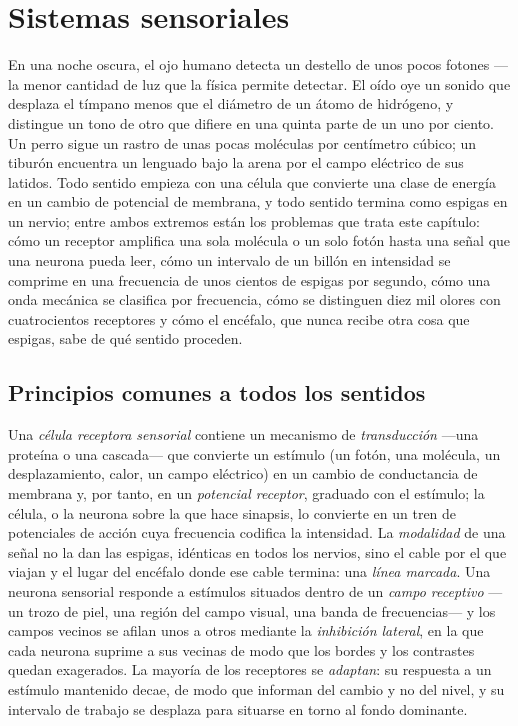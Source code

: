 \chapter{Sistemas sensoriales}\label{ch:b3:sensory-systems}

En una noche oscura, el ojo humano detecta un destello de unos pocos
fotones ---la menor cantidad de luz que la física permite detectar. El
oído oye un sonido que desplaza el tímpano menos que el diámetro de un
átomo de hidrógeno, y distingue un tono de otro que difiere en una
quinta parte de un uno por ciento. Un perro sigue un rastro de unas
pocas moléculas por centímetro cúbico; un tiburón encuentra un lenguado
bajo la arena por el campo eléctrico de sus latidos. Todo sentido
empieza con una célula que convierte una clase de energía en un cambio
de potencial de membrana, y todo sentido termina como espigas en un
nervio; entre ambos extremos están los problemas que trata este
capítulo: cómo un receptor amplifica una sola molécula o un solo fotón
hasta una señal que una neurona pueda leer, cómo un intervalo de un
billón en intensidad se comprime en una frecuencia de unos cientos de
espigas por segundo, cómo una onda mecánica se clasifica por
frecuencia, cómo se distinguen diez mil olores con cuatrocientos
receptores y cómo el encéfalo, que nunca recibe otra cosa que espigas,
sabe de qué sentido proceden.

\section{Principios comunes a todos los sentidos}

\begin{definition}\label{def:b3:sensory-systems:principles}
Una \emph{célula receptora sensorial} contiene un mecanismo de
\emph{transducción} ---una proteína o una cascada--- que convierte un
estímulo (un fotón, una molécula, un desplazamiento, calor, un campo
eléctrico) en un cambio de conductancia de membrana y, por tanto, en un
\emph{potencial receptor}, graduado con el estímulo; la célula, o la
neurona sobre la que hace sinapsis, lo convierte en un tren de
potenciales de acción cuya frecuencia codifica la intensidad. La
\emph{modalidad} de una señal no la dan las espigas, idénticas en todos
los nervios, sino el cable por el que viajan y el lugar del encéfalo
donde ese cable termina: una \emph{línea marcada}. Una neurona
sensorial responde a estímulos situados dentro de un \emph{campo
receptivo} ---un trozo de piel, una región del campo visual, una banda
de frecuencias--- y los campos vecinos se afilan unos a otros mediante
la \emph{inhibición lateral}, en la que cada neurona suprime a sus
vecinas de modo que los bordes y los contrastes quedan exagerados. La
mayoría de los receptores se \emph{adaptan}: su respuesta a un estímulo
mantenido decae, de modo que informan del cambio y no del nivel, y su
intervalo de trabajo se desplaza para situarse en torno al fondo
dominante.
\end{definition}

